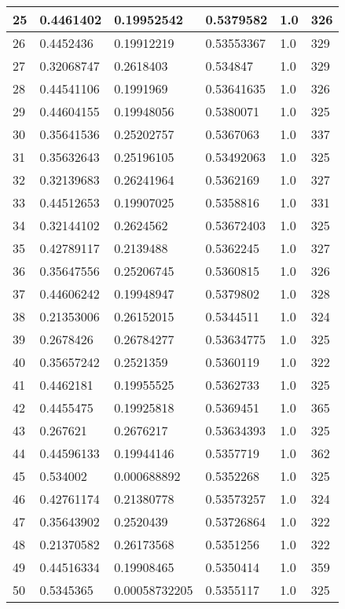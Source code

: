 \begin{longtable}{|l|l|l|l|l|l|}
25 & 0.4461402 & 0.19952542 & 0.5379582 & 1.0 & 326 \\ \hline 
26 & 0.4452436 & 0.19912219 & 0.53553367 & 1.0 & 329 \\ \hline 
27 & 0.32068747 & 0.2618403 & 0.534847 & 1.0 & 329 \\ \hline 
28 & 0.44541106 & 0.1991969 & 0.53641635 & 1.0 & 326 \\ \hline 
29 & 0.44604155 & 0.19948056 & 0.5380071 & 1.0 & 325 \\ \hline 
30 & 0.35641536 & 0.25202757 & 0.5367063 & 1.0 & 337 \\ \hline 
31 & 0.35632643 & 0.25196105 & 0.53492063 & 1.0 & 325 \\ \hline 
32 & 0.32139683 & 0.26241964 & 0.5362169 & 1.0 & 327 \\ \hline 
33 & 0.44512653 & 0.19907025 & 0.5358816 & 1.0 & 331 \\ \hline 
34 & 0.32144102 & 0.2624562 & 0.53672403 & 1.0 & 325 \\ \hline 
35 & 0.42789117 & 0.2139488 & 0.5362245 & 1.0 & 327 \\ \hline 
36 & 0.35647556 & 0.25206745 & 0.5360815 & 1.0 & 326 \\ \hline 
37 & 0.44606242 & 0.19948947 & 0.5379802 & 1.0 & 328 \\ \hline 
38 & 0.21353006 & 0.26152015 & 0.5344511 & 1.0 & 324 \\ \hline 
39 & 0.2678426 & 0.26784277 & 0.53634775 & 1.0 & 325 \\ \hline 
40 & 0.35657242 & 0.2521359 & 0.5360119 & 1.0 & 322 \\ \hline 
41 & 0.4462181 & 0.19955525 & 0.5362733 & 1.0 & 325 \\ \hline 
42 & 0.4455475 & 0.19925818 & 0.5369451 & 1.0 & 365 \\ \hline 
43 & 0.267621 & 0.2676217 & 0.53634393 & 1.0 & 325 \\ \hline 
44 & 0.44596133 & 0.19944146 & 0.5357719 & 1.0 & 362 \\ \hline 
45 & 0.534002 & 0.000688892 & 0.5352268 & 1.0 & 325 \\ \hline 
46 & 0.42761174 & 0.21380778 & 0.53573257 & 1.0 & 324 \\ \hline 
47 & 0.35643902 & 0.2520439 & 0.53726864 & 1.0 & 322 \\ \hline 
48 & 0.21370582 & 0.26173568 & 0.5351256 & 1.0 & 322 \\ \hline 
49 & 0.44516334 & 0.19908465 & 0.5350414 & 1.0 & 359 \\ \hline 
50 & 0.5345365 & 0.00058732205 & 0.5355117 & 1.0 & 325 \\ \hline 
\end{longtable}
